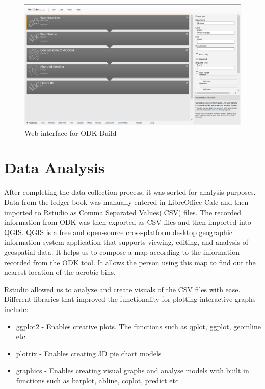 \documentclass[12pt,a4paper]{report}
\begin{document}
\begin{figure}[H]
	\centering
	\includegraphics[width=1\linewidth]{ODKbuild}
	\caption{Web interface for ODK Build}
	\label{fig:odkbuild}
\end{figure}	

\chapter{\textbf{Data Analysis}}

After completing the data collection process, it was sorted for analysis purposes. Data from the ledger book was manually entered in LibreOffice Calc and then imported to Rstudio as Comma Separated Values(.CSV) files. The recorded information from ODK was then exported as CSV files and then imported into QGIS. QGIS is a free and open-source cross-platform desktop geographic information system application that supports viewing, editing, and analysis of geospatial data. It helps us to compose a map according to the information recorded from the ODK tool. It allows the person using this map to find out the nearest location of the aerobic bins.

Rstudio allowed us to analyze and create visuals of the CSV files with ease. Different libraries that improved the functionality for plotting interactive graphs include:

\begin{itemize}
	\item ggplot2 - Enables creative plots. The functions such as qplot, ggplot, geomline etc.
	\item plotrix - Enables creating 3D pie chart models
	\item graphics - Enables creating visual graphs and analyse models with built in functions such as barplot, abline, coplot, predict etc
\end{itemize}
\end{document}
